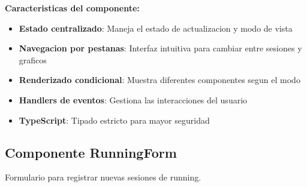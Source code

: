 \documentclass[12pt,a4paper]{article}
\begin{document}
\textbf{Caracteristicas del componente:}
\begin{itemize}
    \item \textbf{Estado centralizado}: Maneja el estado de actualizacion y modo de vista
    \item \textbf{Navegacion por pestanas}: Interfaz intuitiva para cambiar entre sesiones y graficos
    \item \textbf{Renderizado condicional}: Muestra diferentes componentes segun el modo
    \item \textbf{Handlers de eventos}: Gestiona las interacciones del usuario
    \item \textbf{TypeScript}: Tipado estricto para mayor seguridad
\end{itemize}

\subsection{Componente RunningForm}

Formulario para registrar nuevas sesiones de running.
\end{document}
